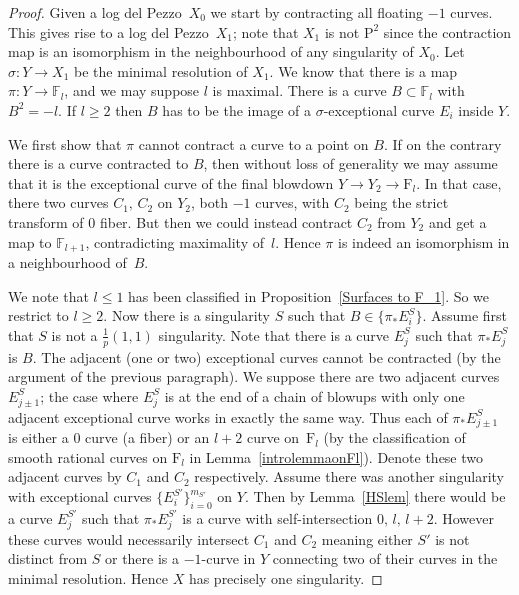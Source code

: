 \documentclass[12pt,a4paper]{book}      %
\newcommand{\ldp}{log del Pezzo}
\newcommand{\mb}[1]{\mathbb{#1}}
\newcommand{\F}{\mathrm{F}}
\renewcommand{\P}{\mathrm{P}}
\begin{document}
\begin{proof}
Given a \ldp\ $X_0$ we start by contracting all floating $-1$ curves. This gives rise to a \ldp\ $X_1$; note that $X_1$ is not $\P^2$ since the contraction map is an isomorphism in the neighbourhood of any singularity of $X_0$. Let $\sigma\colon Y\rightarrow X_1$ be the minimal resolution of $X_1$. We know that there is a map $\pi \colon Y \rightarrow \mathbb{F}_l$, and we may suppose $l$ is maximal.
There is a curve $B \subset \mathbb{F}_l$ with $B^2 = -l$. 
If $l\ge2$ then $B$ has to be the image of a $\sigma$-exceptional curve $E_i$ inside $Y$.

We first show that $\pi$ cannot contract a curve to a point on $B$.
If on the contrary there is a curve contracted to $B$, then
without loss of generality we may assume that it is the exceptional curve of the final blowdown $Y\rightarrow Y_2\rightarrow\F_l$. In that case, there two curves $C_1, \, C_2$ on $Y_2$, both $-1$ curves, with $C_2$ being the strict transform of $0$ fiber. But then we could instead contract $C_2$ from $Y_2$ and get a map to $\mb{F}_{l+1}$, contradicting maximality of~$l$. 
Hence $\pi$ is indeed an isomorphism in a neighbourhood of~$B$.


We note that  $l \leq 1$ has been classified in Proposition~\ref{Surfaces to F_1}. So we restrict to $l \geq 2$. Now there is a singularity $S$ such that $B \in \{ \pi_*E_i^S \}$. Assume first that $S$ is not a $\frac{1}{p}(1,1)$ singularity. Note that there is a curve $E_j^S$ such that $\pi_* E_j^S$ is $B$. The adjacent (one or two) exceptional curves cannot be contracted (by the argument of the previous paragraph). We suppose there are two adjacent curves $E_{j\pm 1}^S$; the case where $E_j^S$ is at the end of a chain of blowups with only one adjacent exceptional curve works in exactly the same way. Thus each of $\pi_*E_{j\pm 1}^S$ is either a $0$ curve (a fiber) or an $l+2$ curve on~$\F_l$ (by the classification of smooth rational curves on $\F_l$ in Lemma~\ref{introlemmaonFl}).
Denote these two adjacent curves by $C_1$ and $C_2$ respectively. Assume there was another singularity with exceptional curves $\{ E_i^{S'} \}_{i=0}^{m_{S'}} $ on $Y$. Then by Lemma~\ref{HSlem} there would be a curve $E_j^{S'}$ such that $\pi_* E_j^{S'}$ is a curve with self-intersection $0, \,  l,\,  l+2$. However these curves would necessarily intersect $C_1$ and $C_2$ meaning either $S'$ is not distinct from $S$ or there is a $-1$-curve in $Y$ connecting two of their curves in the minimal resolution. Hence $X$ has precisely one singularity. 


\end{proof}
\end{document}
